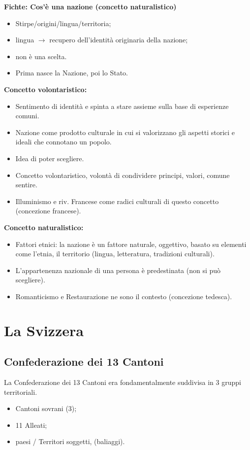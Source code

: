 \documentclass[a4paper]{article}
\begin{document}
\textbf{Fichte: Cos'è una nazione (concetto naturalistico)}
\begin{itemize}
    \item Stirpe/origini/lingua/territoria;
    \item lingua \(\rightarrow\) recupero dell'identità originaria della nazione;
    \item non è una scelta.
    \item Prima nasce la Nazione, poi lo Stato.
\end{itemize}

\textbf{Concetto volontaristico:}
\begin{itemize}
    \item Sentimento di identità e spinta a stare assieme sulla base di esperienze comuni.
    \item Nazione come prodotto culturale in cui si valorizzano gli aspetti storici e ideali che connotano un popolo.
    \item Idea di poter scegliere.
    \item Concetto volontaristico, volontà di condividere principi, valori, comune sentire.
    \item Illuminismo e riv. Francese come radici culturali di questo concetto (concezione francese).
\end{itemize}

\textbf{Concetto naturalistico:}
\begin{itemize}
    \item Fattori etnici: la nazione è un fattore naturale, oggettivo, basato su elementi come l'etnia, il territorio (lingua, letteratura, tradizioni culturali).
    \item L'appartenenza nazionale di una persona è predestinata (non si può scegliere).
    \item Romanticismo e Restaurazione ne sono il contesto (concezione tedesca).
\end{itemize}

\pagebreak

\section{La Svizzera}

\subsection{Confederazione dei 13 Cantoni}

La Confederazione dei 13 Cantoni era fondamentalmente suddivisa in 3 gruppi territoriali.
\begin{itemize}
    \item Cantoni sovrani (3);
    \item 11 Alleati;
    \item paesi / Territori soggetti, (baliaggi).
\end{itemize}
\end{document}
